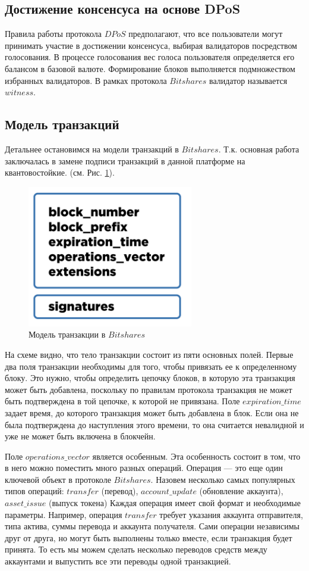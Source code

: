 \documentclass[a4paper, 14pt]{extarticle}
\begin{document}
\subsection{Достижение консенсуса на основе DPoS}
Правила работы протокола $DPoS$ предполагают, что все пользователи могут принимать участие в достижении консенсуса, выбирая валидаторов посредством голосования. В процессе голосования вес голоса пользователя определяется его балансом в базовой валюте. Формирование блоков выполняется подмножеством избранных валидаторов. В рамках протокола $Bitshares$ валидатор называется $witness$.

\subsection{Модель транзакций}
Детальнее остановимся на модели транзакций в $Bitshares$. Т.к. основная работа заключалась в замене подписи транзакций в данной платформе на квантовостойкие. (см. Рис. \ref{fig:Bitshares_trx_model}).

\begin{figure}[h]
    \centering
    \includegraphics[scale=0.5]{Bitshares_trx_model.png}
    \caption{Модель транзакции в $Bitshares$}
    \label{fig:Bitshares_trx_model}
\end{figure}

На схеме видно, что тело транзакции состоит из пяти основных полей. Первые два поля транзакции необходимы для того, чтобы привязать ее к определенному блоку. Это нужно, чтобы определить цепочку блоков, в которую эта транзакция может быть добавлена, поскольку по правилам протокола транзакция не может быть подтверждена в той цепочке, к которой не привязана. Поле $expiration\_time$ задает время, до которого транзакция может быть добавлена в блок. Если она не была подтверждена до наступления этого времени, то она считается невалидной и уже не может быть включена в блокчейн.

Поле $operations\_vector$ является особенным. Эта особенность состоит в том, что в него можно поместить много разных операций. Операция — это еще один ключевой объект в протоколе $Bitshares$. Назовем несколько самых популярных типов операций: $transfer$ (перевод), $account\_update$ (обновление аккаунта), $asset\_issue$ (выпуск токена) Каждая операция имеет свой формат и необходимые параметры. Например, операция $transfer$ требует указания аккаунта отправителя, типа актива, суммы перевода и аккаунта получателя. Сами операции независимы друг от друга, но могут быть выполнены только вместе, если транзакция будет принята. То есть мы можем сделать несколько переводов средств между аккаунтами и выпустить все эти переводы одной транзакцией.
\end{document}
